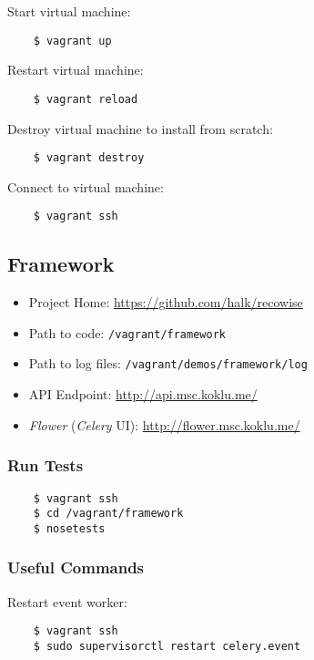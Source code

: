 Start virtual machine:

\begin{verbatim}
    $ vagrant up
\end{verbatim}

Restart virtual machine:

\begin{verbatim}
    $ vagrant reload
\end{verbatim}

Destroy virtual machine to install from scratch:

\begin{verbatim}
    $ vagrant destroy
\end{verbatim}

Connect to virtual machine:

\begin{verbatim}
    $ vagrant ssh
\end{verbatim}


\subsection{Framework}

\begin{itemize}
\item Project Home: \url{https://github.com/halk/recowise}
\item Path to code: \texttt{/vagrant/framework}
\item Path to log files: \texttt{/vagrant/demos/framework/log}
\item API Endpoint: \url{http://api.msc.koklu.me/}
\item \emph{Flower} (\emph{Celery} UI): \url{http://flower.msc.koklu.me/}
\end{itemize}

\subsubsection{Run Tests}

\begin{verbatim}
    $ vagrant ssh
    $ cd /vagrant/framework
    $ nosetests
\end{verbatim}

\subsubsection{Useful Commands}

Restart event worker:

\begin{verbatim}
    $ vagrant ssh
    $ sudo supervisorctl restart celery.event
\end{verbatim}

